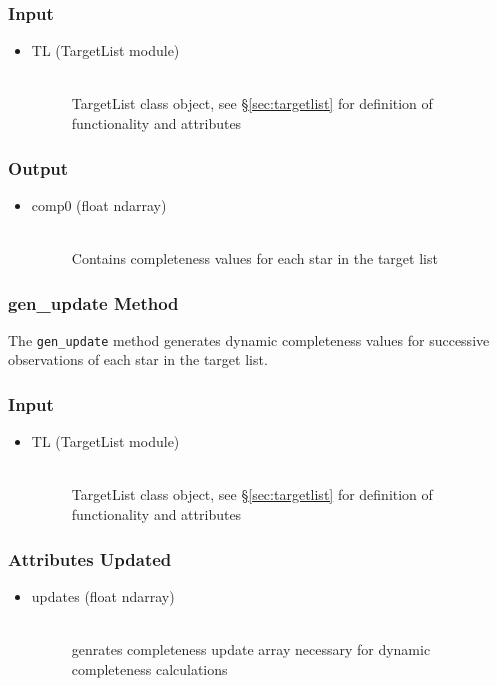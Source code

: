 \documentclass[cleanfoot]{asme2ej}
\begin{document}
\subsubsection*{Input}
\begin{itemize}
\item 
\begin{description}
    \item[TL (TargetList module)] \hfill \\ TargetList class object, see \S\ref{sec:targetlist} for definition of functionality and attributes
\end{description}
\end{itemize}
\subsubsection*{Output}
\begin{itemize}
\item 
\begin{description}
    \item[comp0 (float ndarray)] \hfill \\ Contains completeness values for each star in the target list
\end{description}
\end{itemize}

\subsubsection{gen\_update Method} \label{sec:genupdatetask}
The \verb+gen_update+ method generates dynamic completeness values for successive observations of each star in the target list.
\subsubsection*{Input}
\begin{itemize}
\item 
\begin{description}
    \item[TL (TargetList module)] \hfill \\ TargetList class object, see \S\ref{sec:targetlist} for definition of functionality and attributes
\end{description}
\end{itemize}
\subsubsection*{Attributes Updated}
\begin{itemize}
\item
\begin{description}
    \item[updates (float ndarray)] \hfill \\ genrates completeness update array necessary for dynamic completeness calculations
\end{description}
\end{itemize}
\end{document}
